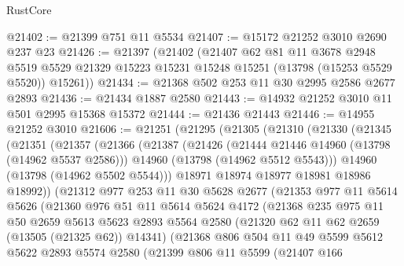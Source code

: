 \begin{lexlean}{RustCore}
\begin{coremodule}
@21402 := @21399 @751 @11 @5534
@21407 := @15172 @21252 @3010 @2690 @237 @23
@21426 := @21397
    (@21402
      (@21407
        @62
        @81
        @11
        @3678
        @2948
        @5519
        @5529
        @21329
        @15223
        @15231
        @15248
        @15251
        (@13798 (@15253 @5529 @5520))
        @15261))
@21434 := @21368 @502 @253 @11 @30 @2995 @2586 @2677 @2893
@21436 := @21434 @1887 @2580
@21443 := @14932 @21252 @3010 @11 @501 @2995 @15368 @15372
@21444 := @21436 @21443
@21446 := @14955 @21252 @3010
@21606 := @21251
    (@21295
      (@21305
        (@21310
          (@21330
            (@21345
              (@21351
                (@21357
                  (@21366
                    (@21387
                      (@21426
                        (@21444 @21446 @14960 (@13798 (@14962 @5537 @2586)))
                        @14960
                        (@13798 (@14962 @5512 @5543)))
                      @14960
                      (@13798 (@14962 @5502 @5544)))
                    @18971
                    @18974
                    @18977
                    @18981
                    @18986
                    @18992))
                (@21312
                  @977
                  @253
                  @11
                  @30
                  @5628
                  @2677
                  (@21353
                    @977
                    @11
                    @5614
                    @5626
                    (@21360
                      @976
                      @51
                      @11
                      @5614
                      @5624
                      @4172
                      (@21368
                        @235
                        @975
                        @11
                        @50
                        @2659
                        @5613
                        @5623
                        @2893
                        @5564
                        @2580
                        (@21320 @62 @11 @62 @2659 (@13505 (@21325 @62)) @14341)
                        (@21368
                          @806
                          @504
                          @11
                          @49
                          @5599
                          @5612
                          @5622
                          @2893
                          @5574
                          @2580
                          (@21399
                            @806
                            @11
                            @5599
                            (@21407
                              @166

\end{coremodule}
\end{lexlean}
